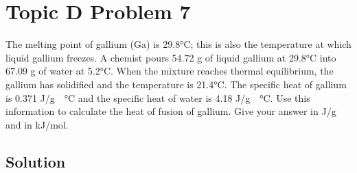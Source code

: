 \documentclass[10pt]{article}
\begin{document}
    \pagebreak
    \section{Topic D Problem 7}
        The melting point of gallium (Ga) is 29.8\unit{\celsius}; this is also the temperature at which liquid gallium freezes. 
        A chemist pours 54.72 g of liquid gallium at 29.8\unit{\celsius} into 67.09 g of water at 5.2\unit{\celsius}. 
        When the mixture reaches thermal equilibrium, the gallium has solidified and the temperature is 21.4\unit{\celsius}. 
        The specific heat of gallium is 0.371 \unit{\joule/\gram\cdot\celsius} and the specific heat of water is 4.18 \unit{\joule/\gram\cdot\celsius}. 
        Use this information to calculate the heat of fusion of gallium. 
        Give your answer in J/g and in kJ/mol.

        \subsection{Solution}
    
    \pagebreak
    \tableofcontents
\end{document}
